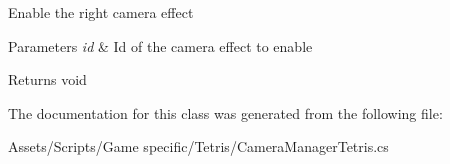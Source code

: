 Enable the right camera effect 


\begin{DoxyParams}{Parameters}
{\em id} & Id of the camera effect to enable\\
\hline
\end{DoxyParams}
\begin{DoxyReturn}{Returns}
void
\end{DoxyReturn}


The documentation for this class was generated from the following file\-:\begin{DoxyCompactItemize}
\item 
Assets/\-Scripts/\-Game specific/\-Tetris/Camera\-Manager\-Tetris.\-cs\end{DoxyCompactItemize}
